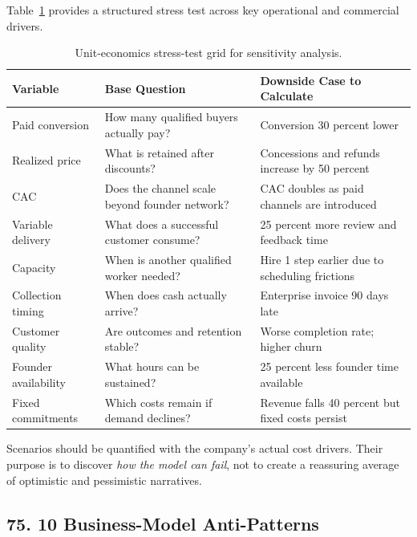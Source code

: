 Table~\ref{tab:unit-economics-stress-test} provides a structured stress test across key operational and commercial drivers.

\begin{table}[htbp]
\centering
\small
\begin{tabularx}{\textwidth}{p{3.2cm}XX}
\toprule
\textbf{Variable} & \textbf{Base Question} & \textbf{Downside Case to Calculate} \\
\midrule
Paid conversion & How many qualified buyers actually pay? & Conversion 30 percent lower \\
\addlinespace
Realized price & What is retained after discounts? & Concessions and refunds increase by 50 percent \\
\addlinespace
CAC & Does the channel scale beyond founder network? & CAC doubles as paid channels are introduced \\
\addlinespace
Variable delivery & What does a successful customer consume? & 25 percent more review and feedback time \\
\addlinespace
Capacity & When is another qualified worker needed? & Hire 1 step earlier due to scheduling frictions \\
\addlinespace
Collection timing & When does cash actually arrive? & Enterprise invoice 90 days late \\
\addlinespace
Customer quality & Are outcomes and retention stable? & Worse completion rate; higher churn \\
\addlinespace
Founder availability & What hours can be sustained? & 25 percent less founder time available \\
\addlinespace
Fixed commitments & Which costs remain if demand declines? & Revenue falls 40 percent but fixed costs persist \\
\bottomrule
\end{tabularx}
\caption{Unit-economics stress-test grid for sensitivity analysis.}
\label{tab:unit-economics-stress-test}
\end{table}

Scenarios should be quantified with the company's actual cost drivers. Their purpose is to discover \emph{how the model can fail}, not to create a reassuring average of optimistic and pessimistic narratives.

\subsection*{75. 10 Business-Model Anti-Patterns}

